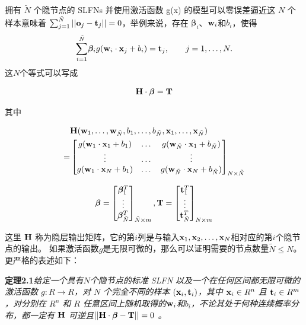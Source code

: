 \documentclass[conference]{IEEEtran}
\begin{document}
拥有 $\tilde N$ 个隐节点的 SLFNs 并使用激活函数 g(x) 的模型可以零误差逼近这 $N$ 个样本意味着 $\sum^{\tilde{N}}_{j=1}||{\bf{o}}_j-{\bf{t}}_j||=0$，举例来说，存在 $ {\bm{\beta}}_i$、${{\bf{w}}_i}$和$b_i$，使得
\begin{align}\label{eq2}
	\overset{\tilde{N}}{\underset{i=1}{\sum}}{{\bm{\beta}}_i}g({{\bf{w}}_i}\cdot{{\bf{x}}_j}+b_i)={\bf{t}}_j,\hspace{2em}j=1,\dots,N.
\end{align}
这$N$个等式可以写成

\begin{align}\label{eq3}
	{\bf{H}}\cdot{\bm{\beta}}={\bf{T}}
\end{align}

其中

\begin{align}\label{eq4}
	& {\bf{H}}({\bf{w}}_1,\dots,{\bf{w}}_{\tilde{N}},b_1,\dots,b_{\tilde{N}},{\bf{x}}_1,\dots,{\bf{x}}_{\tilde{N}}) \notag\\
	= & \begin{bmatrix}
		g({{\bf{w}}_1}\cdot{{\bf{x}}_1}+b_1) & \dots & g({{\bf{w}}_{\tilde{N}}}\cdot{{\bf{x}}_1}+b_{\tilde{N}}) \\
		\vdots & \dots & \vdots \\
		g({{\bf{w}}_1}\cdot{{\bf{x}}_N}+b_1) & \dots & g({{\bf{w}}_{\tilde{N}}}\cdot{{\bf{x}}_N}+b_{\tilde{N}})
	\end{bmatrix}_{N\times{\tilde{N}}}
	\end{align}

\begin{align}\label{eq5}
	{\bm{\beta}}=
	\begin{bmatrix}
		{\bm{\beta}}_1^T\\
		\vdots \\
		{\bm{\beta}}_{\tilde{N}}^T
	\end{bmatrix}_{\tilde{N}\times m},
	{\bf{T}}=\begin{bmatrix}
		{\bf{t}}_1^T\\
		\vdots\\
		{\bf{t}}_{\tilde{N}}^T
	\end{bmatrix}_{N\times m}
\end{align}

这里 ${\bf{H}}$ 称为隐层输出矩阵，它的第$i$列是与输入${\bf x}_1,{\bf x}_2,\dots,{\bf x}_N$相对应的第$i$个隐节点的输出。
如果激活函数$g$是无限可微的，那么可以证明需要的节点数量$\tilde{N}\le N$。更严格的表述如下：

\textbf{定理2.1}\textit{给定一个具有$N$个隐节点的标准 SLFN 以及一个在任何区间都无限可微的激活函数 $g: R\rightarrow R$，对 $N$ 个完全不同的样本 $({\bf x}_i,{\bf t}_i )$，其中 ${\bf x}_i\in R^n$ 且 ${\bf t}_i\in R^m$，对分别在 $R^n$ 和 $R$ 任意区间上随机取得的${\bf w}_i$和$b_i$，不论其处于何种连续概率分布，都一定有 ${\bf H}$ 可逆且${||\bf{H}}\cdot{\bm{\beta}}-{\bf{T}}||=0$ 。}
\end{document}
